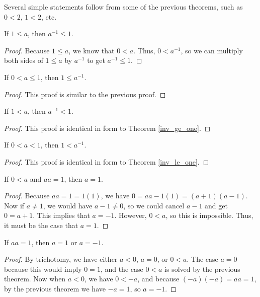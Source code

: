 \documentclass[../math.tex]{subfiles}
\begin{document}
Several simple statements follow from some of the previous theorems, such as $0
< 2$, $1 < 2$, etc.

\begin{theorem} \label{inv_ge_one}
    If $1 \leq a$, then $a^{-1} \leq 1$.
\end{theorem}
\begin{proof}
    Because $1 \leq a$, we know that $0 < a$.  Thus, $0 < a^{-1}$, so we can
    multiply both sides of $1 \leq a$ by $a^{-1}$ to get $a^{-1} \leq 1$.
\end{proof}

\begin{theorem} \label{inv_le_one}
    If $0 < a \leq 1$, then $1 \leq a^{-1}$.
\end{theorem}
\begin{proof}
    This proof is similar to the previous proof.
\end{proof}

\begin{theorem}
    If $1 < a$, then $a^{-1} < 1$.
\end{theorem}
\begin{proof}
    This proof is identical in form to Theorem \ref{inv_ge_one}.
\end{proof}

\begin{theorem}
    If $0 < a < 1$, then $1 < a^{-1}$.
\end{theorem}
\begin{proof}
    This proof is identical in form to Theorem \ref{inv_le_one}.
\end{proof}

\begin{theorem}
    If $0 < a$ and $aa = 1$, then $a = 1$.
\end{theorem}
\begin{proof}
    Because $aa = 1 = 1(1)$, we have $0 = aa - 1(1) = (a + 1)(a - 1)$.  Now if
    $a \neq 1$, we would have $a - 1 \neq 0$, so we could cancel $a - 1$ and get
    $0 = a + 1$.  This implies that $a = -1$.  However, $0 < a$, so this is
    impossible.  Thus, it must be the case that $a = 1$.
\end{proof}

\begin{theorem}
    If $aa = 1$, then $a = 1$ or $a = -1$.
\end{theorem}
\begin{proof}
    By trichotomy, we have either $a < 0$, $a = 0$, or $0 < a$.  The case $a =
    0$ because this would imply $0 = 1$, and the case $0 < a$ is solved by the
    previous theorem.  Now when $a < 0$, we have $0 < -a$, and because $(-a)(-a)
    = aa = 1$, by the previous theorem we have $-a = 1$, so $a = -1$.
\end{proof}
\end{document}

